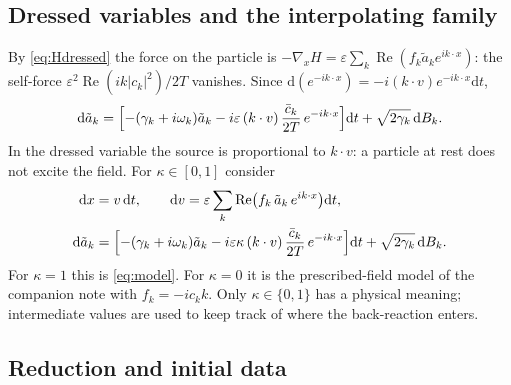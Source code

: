 \documentclass[11pt]{article}
\newcommand{\dd}{\mathrm{d}}
\newcommand{\eps}{\varepsilon}
\renewcommand{\Re}{\operatorname{Re}}
\theoremstyle{remark}
\begin{document}
\subsection{Dressed variables and the interpolating family}

By \eqref{eq:Hdressed} the force on the particle is
$-\nabla_xH=\eps\sum_k\Re(f_k\tilde a_ke^{ik\cdot x})$: the self-force
$\eps^2\Re(ik|c_k|^2)/2T$ vanishes. Since
$\dd(e^{-ik\cdot x})=-i(k\cdot v)e^{-ik\cdot x}\dd t$,
\[
  \dd\tilde a_k=\Bigl[-(\gamma_k+i\omega_k)\tilde a_k
     -i\eps\,(k\cdot v)\,\frac{\bar c_k}{2T}\,e^{-ik\cdot x}\Bigr]\dd t
     +\sqrt{2\gamma_k}\,\dd B_k .
\]
In the dressed variable the source is proportional to $k\cdot v$: a particle
at rest does not excite the field. For $\kappa\in[0,1]$ consider
\begin{equation}
\begin{aligned}
  \dd x&=v\,\dd t,\qquad
  \dd v=\eps\sum_k\Re\bigl(f_k\,\tilde a_k\,e^{ik\cdot x}\bigr)\dd t,\\
  \dd\tilde a_k&=\Bigl[-(\gamma_k+i\omega_k)\tilde a_k
     -i\eps\kappa\,(k\cdot v)\,\frac{\bar c_k}{2T}\,e^{-ik\cdot x}\Bigr]\dd t
     +\sqrt{2\gamma_k}\,\dd B_k .
\end{aligned}
\label{eq:kappa}
\end{equation}
For $\kappa=1$ this is \eqref{eq:model}. For $\kappa=0$ it is the
prescribed-field model of the companion note with $f_k=-ic_kk$. Only
$\kappa\in\{0,1\}$ has a physical meaning; intermediate values are used to
keep track of where the back-reaction enters.

\subsection{Reduction and initial data}
\end{document}
